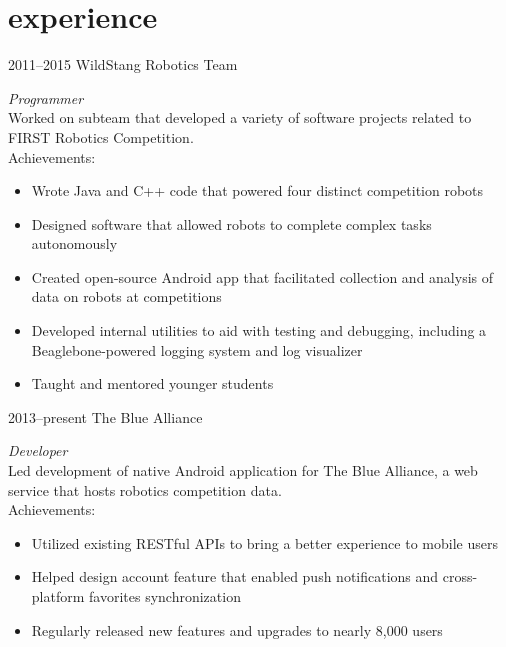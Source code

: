 \documentclass[nofooter]{resume}
\begin{document}

\section{experience}


\begin{entrylist}


\entry
{2011--2015}
{WildStang Robotics Team}
{}
{\emph{Programmer} \\
Worked on subteam that developed a variety of software projects related to FIRST Robotics Competition. \\
Achievements:
\noindent\begin{itemize}[leftmargin=0.45cm]
\item Wrote Java and C++ code that powered four distinct competition robots
\item Designed software that allowed robots to complete complex tasks autonomously
\item Created open-source Android app that facilitated collection and analysis of data on robots at competitions
\item Developed internal utilities to aid with testing and debugging, including a Beaglebone-powered logging system and log visualizer
\item Taught and mentored younger students
\end{itemize}}


\entry
{2013--present}
{The Blue Alliance}
{}
{\emph{Developer} \\
Led development of native Android application for The Blue Alliance, a web service that hosts robotics competition data. \\
Achievements:
\noindent\begin{itemize}[leftmargin=0.45cm]
\item Utilized existing RESTful APIs to bring a better experience to mobile users
\item Helped design account feature that enabled push notifications and cross-platform favorites synchronization
\item Regularly released new features and upgrades to nearly 8,000 users
\end{itemize}}

\end{entrylist}
\end{document}
